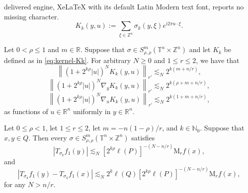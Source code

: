 \documentclass[10pt,a4paper]{amsart}
\begin{document}
delivered engine, XeLaTeX with its default Latin Modern text font, reports no missing character.
\begin{equation}
    K_k(y, u) := \sum_{\xi \in \mathbb{Z}^n} \sigma_k(y, \xi)e^{i2\pi u \cdot \xi}.
    \label{eq:kernel-Kk}
\end{equation}

\begin{lemma}
    Let $0 < \rho \leq 1$ and $m\in \mathbb{R}$. Suppose that $\sigma \in S^m_{\rho,\rho}(\mathbb{T}^n \times \mathbb{Z}^n) $ and let $K_k$ be defined as in \cref{eq:kernel-Kk}. For arbitrary $N\geq 0$ and $1\leq r\leq 2$, we have that 
    \begin{equation*}
        \left\| (1+2^{k\rho}|u|)^N K_k(y, u)
        \right\|_{r'} \lesssim_N 2^{k(m+n/r)},
    \end{equation*}
    \begin{equation*}
        \left\| (1+2^{k\rho}|u|)^N \nabla_y K_k(y, u)
        \right\|_{r'} \lesssim_N 2^{k(\rho+m+n/r)},
    \end{equation*}
    \begin{equation*}
        \left\| (1+2^{k\rho}|u|)^N \nabla_u K_k(y, u)
        \right\|_{r'} \lesssim_N 2^{k(1+m+n/r)},
    \end{equation*}
    as functions of $u\in\mathbb{R}^n$ uniformly in $y\in\mathbb{R}^n$.
    \label{lem:kernel-estimates}
\end{lemma}

\begin{proposition}
    Let $0\leq \rho<1$, let $1\leq r\leq2$, let $m=-n(1-\rho)/r$, and $k\in\mathbb{N}_0$. Suppose that $x, y \in Q$. Then every $\sigma \in S^m_{\rho,\rho}(\mathbb{T}^n \times \mathbb{Z}^n) $ satisfies
    \begin{equation}
        |T_{\sigma_k}f_1(y)| \lesssim_N [2^{k\rho}\ell(P)]^{-(N-n/r)} \mathrm{M}_rf(x),
        \label{eq:f1-estimate}
    \end{equation}
    and
    \begin{equation}
        |T_{\sigma_k}f_1(y) - T_{\sigma_k}f_1(x)| \lesssim_N 2^k\ell(Q) [2^{k\rho}\ell(P)]^{-(N-n/r)} \mathrm{M}_rf(x),
        \label{eq:diff-f1}
    \end{equation}
    for any $N>n/r$.
\end{proposition}
\end{document}
